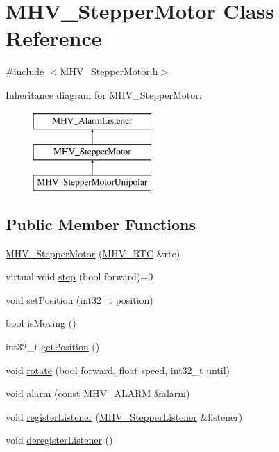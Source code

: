 \hypertarget{class_m_h_v___stepper_motor}{
\section{\-M\-H\-V\-\_\-\-Stepper\-Motor \-Class \-Reference}
\label{class_m_h_v___stepper_motor}
}


{\ttfamily \#include $<$\-M\-H\-V\-\_\-\-Stepper\-Motor.\-h$>$}

\-Inheritance diagram for \-M\-H\-V\-\_\-\-Stepper\-Motor\-:\begin{figure}[H]
\begin{center}
\leavevmode
\includegraphics[height=3.000000cm]{class_m_h_v___stepper_motor}
\end{center}
\end{figure}
\subsection*{\-Public \-Member \-Functions}
\begin{DoxyCompactItemize}
\item 
\hyperlink{class_m_h_v___stepper_motor_a9191d81816485237d467763022712edf}{\-M\-H\-V\-\_\-\-Stepper\-Motor} (\hyperlink{class_m_h_v___r_t_c}{\-M\-H\-V\-\_\-\-R\-T\-C} \&rtc)
\item 
virtual void \hyperlink{class_m_h_v___stepper_motor_a86dd84a2cd353e64b618f6f8dcb6d1e0}{step} (bool forward)=0
\item 
void \hyperlink{class_m_h_v___stepper_motor_a0693b678c6f9a2faa4bbad7d7bc61f56}{set\-Position} (int32\-\_\-t position)
\item 
bool \hyperlink{class_m_h_v___stepper_motor_a4841a6579cbe6a76f9e1c424674fb633}{is\-Moving} ()
\item 
int32\-\_\-t \hyperlink{class_m_h_v___stepper_motor_a7721897d995212e79af8a6701dbd6abb}{get\-Position} ()
\item 
void \hyperlink{class_m_h_v___stepper_motor_a921e5aaac1a60eade58b8c29edfda53d}{rotate} (bool forward, float speed, int32\-\_\-t until)
\item 
void \hyperlink{class_m_h_v___stepper_motor_aa2be497715473018cac225732b995b5d}{alarm} (const \hyperlink{_m_h_v___r_t_c_8h_af13307658f41fba330ffae04dd5cbce6}{\-M\-H\-V\-\_\-\-A\-L\-A\-R\-M} \&alarm)
\item 
void \hyperlink{class_m_h_v___stepper_motor_aa8a40a53160fed20a1c5cd3bd9436dc1}{register\-Listener} (\hyperlink{class_m_h_v___stepper_listener}{\-M\-H\-V\-\_\-\-Stepper\-Listener} \&listener)
\item 
void \hyperlink{class_m_h_v___stepper_motor_aa162df6dc479e27449cf394b083e759c}{deregister\-Listener} ()
\end{DoxyCompactItemize}



